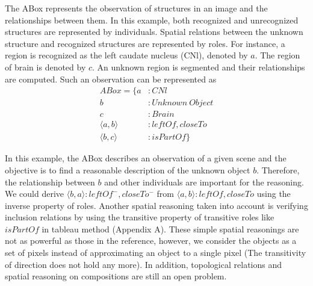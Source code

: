 \documentclass{article}
\begin{document}
The ABox represents the observation of structures in an image and the relationships between them.
In this example, both recognized and unrecognized structures are represented by individuals. Spatial relations between the unknown structure and
recognized structures are represented by roles.
For instance, a region is recognized as the left caudate nucleus (CNl), denoted by $a$.
The region of brain is denoted by $c$. An unknown region is segmented and their relationships are computed.  
Such an observation can be represented as
\begin{align*}
 ABox=\{ a&: CNl \\
	 b&: Unknown~Object \\
	 c&: Brain \\
	 \langle a,b\rangle &: leftOf, closeTo \\
	 \langle b,c\rangle &: isPartOf\}
\end{align*}

In this example, the ABox describes an observation of a given scene and the objective is to find a reasonable description of  the unknown object $b$.
Therefore, the relationship between $b$ and other individuals are important for the reasoning. 
We could derive $\langle b,a\rangle:leftOf^-,closeTo^-$ from $\langle a,b\rangle:leftOf,closeTo$ using the inverse property of roles.
Another spatial reasoning taken into account is verifying inclusion relations by using the transitive property of transitive roles like $isPartOf$ in tableau method (Appendix A). 
These simple spatial reasonings are not as powerful as those in the reference, however, we consider the objects as a set of pixels instead of approximating an object to a single pixel 
(The transitivity of direction does not hold any more).
In addition, topological relations and spatial reasoning on compositions are still an open problem.
% 
\end{document}
